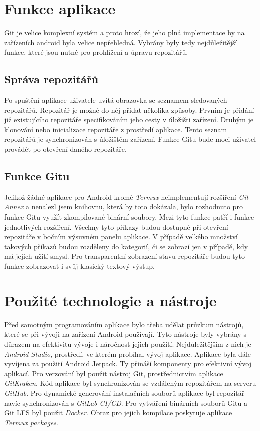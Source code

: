     \section{Funkce aplikace}
        Git je velice komplexní systém a proto hrozí, že jeho plná implementace by na zařízeních android byla velice nepřehledná. Vybrány byly tedy nejdůležitější funkce, které jsou nutné pro prohlížení a úpravu repozitářů. 

        \subsection{Správa repozitářů}
        Po spuštění aplikace uživatele uvítá obrazovka se seznamem sledovaných repozitářů. Repozitář je možné do něj přidat několika způsoby. Prvním je přidání již existujícího repozitáře specifikováním jeho cesty v úložišti zařízení. Druhým je klonování nebo inicializace repozitáře z prostředí aplikace. Tento seznam repozitářů je synchronizován s úložištěm zařízení. Funkce Gitu bude moci uživatel provádět po otevření daného repozitáře.

        \subsection{Funkce Gitu}
        Jelikož žádné aplikace pro Android kromě \emph{Termux} neimplementují rozšíření \emph{Git Annex} a nenalezl jsem knihovnu, která by toto dokázala, bylo rozhodnuto pro funkce Gitu využít zkompilované binární soubory. Mezi tyto funkce patří i funkce jednotlivých rozšíření. Všechny tyto příkazy budou dostupné při otevření repozitáře v bočním výsuvném panelu aplikace. V případě velkého množství takových příkazů budou rozděleny do kategorií, či se zobrazí jen v případě, kdy má jejich užití smysl. Pro transparentní zobrazení stavu repozitáře budou tyto funkce zobrazovat i svůj klasický textový výstup.

    \section{Použité technologie a nástroje}
        Před samotným programováním aplikace bylo třeba udělat průzkum nástrojů, které se při vývoji na zařízení Android používají. Tyto nástroje byly vybrány s důrazem na efektivitu vývoje i náročnost jejich použití. Nejdůležitějším z nich je \emph{Android Studio}, prostředí, ve kterém probíhal vývoj aplikace. Aplikace byla dále vyvíjena za použití Android Jetpack. Ty přináší komponenty pro efektivní vývoj aplikací. Pro verzování byl použit nástroj Git, prostřednictvím aplikace \emph{GitKraken}. Kód aplikace byl synchronizován se vzdáleným repozitářem na serveru \emph{GitHub}. Pro dynamické generování instalačních souborů aplikace byl repozitář navíc synchronizován s \emph{GitLab CI/CD}. Pro vytváření binárních souborů Gitu a Git LFS byl použit \emph{Docker}. Obraz pro jejich kompilace poskytuje aplikace \emph{Termux packages}.

